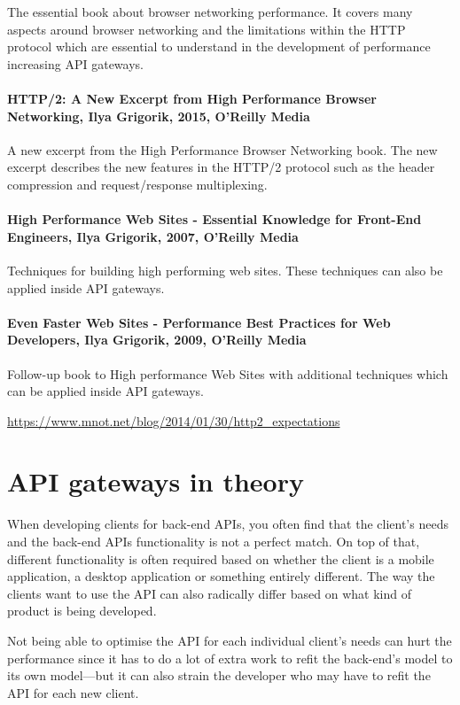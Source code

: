 \documentclass{cslthse-msc}
\begin{document}
The essential book about browser networking performance. It covers many aspects around browser networking and the limitations within the HTTP protocol which are essential to understand in the development of performance increasing API gateways.

\subsubsection{HTTP/2: A New Excerpt from High Performance Browser Networking, Ilya Grigorik, 2015, O'Reilly Media}

A new excerpt from the High Performance Browser Networking book. The new excerpt describes the new features in the HTTP/2 protocol such as the header compression and request/response multiplexing.

\subsubsection{High Performance Web Sites - Essential Knowledge for Front-End Engineers, Ilya Grigorik, 2007, O'Reilly Media}

Techniques for building high performing web sites. These techniques can also be applied inside API gateways.

\subsubsection{Even Faster Web Sites - Performance Best Practices for Web Developers, Ilya Grigorik, 2009, O'Reilly Media}

Follow-up book to High performance Web Sites with additional techniques which can be applied inside API gateways.

\noindent \url{https://www.mnot.net/blog/2014/01/30/http2_expectations}

\chapter{API gateways in theory}
When developing clients for back-end APIs, you often find that the client's needs and the back-end APIs functionality is not a perfect match. On top of that, different functionality is often required based on whether the client is a mobile application, a desktop application or something entirely different. The way the clients want to use the API can also radically differ based on what kind of product is being developed.

Not being able to optimise the API for each individual client's needs can hurt the performance since it has to do a lot of extra work to refit the back-end's model to its own model---but it can also strain the developer who may have to refit the API for each new client.
\end{document}
